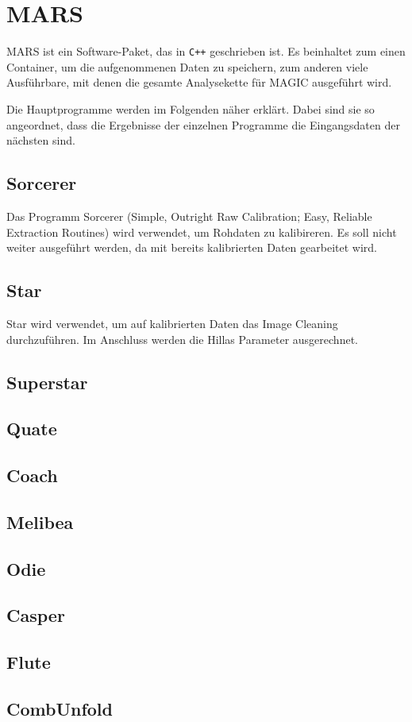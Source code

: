 \section{MARS}%
\label{sec:mars}

MARS ist ein Software-Paket, das in \texttt{C++} geschrieben ist.
Es beinhaltet zum einen Container, um die aufgenommenen Daten zu speichern,
zum anderen viele Ausführbare,
mit denen die gesamte Analysekette für MAGIC ausgeführt wird.

Die Hauptprogramme werden im Folgenden näher erklärt.
Dabei sind sie so angeordnet, dass die Ergebnisse der einzelnen
Programme die Eingangsdaten der nächsten sind.

\subsection{Sorcerer}%
\label{sub:sorcerer}

Das Programm Sorcerer (Simple, Outright Raw Calibration; Easy, Reliable
Extraction Routines) wird verwendet, um Rohdaten zu kalibireren.
Es soll nicht weiter ausgeführt werden, da mit bereits kalibrierten Daten
gearbeitet wird.

\subsection{Star}%
\label{sub:star}

Star wird verwendet, um auf kalibrierten Daten
das Image Cleaning %
durchzuführen.
Im Anschluss werden die Hillas Parameter ausgerechnet.


\subsection{Superstar}%
\label{sub:superstar}

\subsection{Quate}%
\label{sub:quate}

\subsection{Coach}%
\label{sub:coach}

\subsection{Melibea}%
\label{sub:melibea}

\subsection{Odie}%
\label{sub:odie}

\subsection{Casper}%
\label{sub:casper}

\subsection{Flute}%
\label{sub:flute}

\subsection{CombUnfold}%
\label{sub:combunfold}
